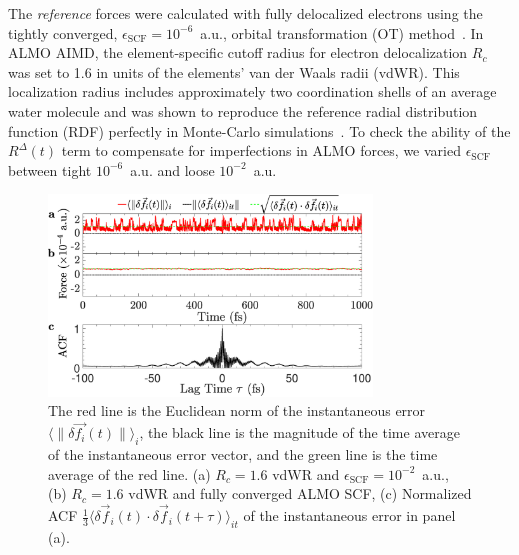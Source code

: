 \documentclass[aip,jcp,reprint,amsmath,amssymb]{revtex4-1}
\begin{document}
The \emph{reference} forces were calculated with fully delocalized electrons using the tightly converged, $\epsilon_{\text{SCF}}=10^{-6}$~a.u., orbital transformation (OT) method~\cite{a:ot}. 
In ALMO AIMD, the element-specific cutoff radius for electron delocalization $R_c$ was set to 1.6 in units of the elements' van der Waals radii (vdWR). This localization radius includes approximately two coordination shells of an average water molecule and was shown to reproduce the reference radial distribution function (RDF) perfectly in Monte-Carlo simulations~\cite{a:almo-ls}. 
%
To check the ability of the $R^{\Delta}(t)$ term to compensate for imperfections in ALMO forces, we varied $\epsilon_{\text{SCF}}$ between tight $10^{-6}$~a.u. and loose $10^{-2}$~a.u. 

\begin{figure}
\includegraphics[trim={0cm 0cm 0cm 0cm},clip,width=8.6cm]{2.eps}
\caption{\label{fig:randomforce} 
The red line is the Euclidean norm of the instantaneous error $\langle \| \delta \vec{f_{i}}(t) \| \rangle_{i}$, the black line is the magnitude of the time average of the instantaneous error vector, and the green line is the time average of the red line. 
(a) $R_{c} = 1.6$ vdWR and $\epsilon_{\text{SCF}} = 10^{-2}$~a.u., 
(b) $R_{c} = 1.6$ vdWR and fully converged ALMO SCF, 
(c) Normalized ACF $\frac{1}{3}\langle \delta \vec{f}_i (t) \cdot \delta\vec{f}_i(t+\tau) \rangle_{it}$ of the instantaneous error in panel (a).
}
\end{figure}
\end{document}
